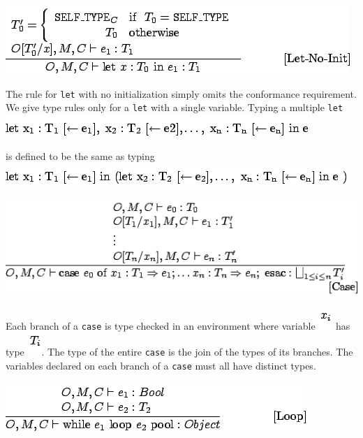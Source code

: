 \documentclass[]{article}
\begin{document}
\includegraphics{img94.png}

The rule for \texttt{let} with no initialization simply omits the
conformance requirement. We give type rules only for a \texttt{let} with
a single variable. Typing a multiple \texttt{let} \\

\includegraphics{img95.png}

is defined to be the same as typing \\

\includegraphics{img96.png}

\includegraphics{img97.png}

Each branch of a \texttt{case} is type checked in an environment where
variable \includegraphics{img98.png} has type
\includegraphics{img99.png}. The type of the entire \texttt{case} is the
join of the types of its branches. The variables declared on each branch
of a \texttt{case} must all have distinct types.

\includegraphics{img100.png}
\end{document}
